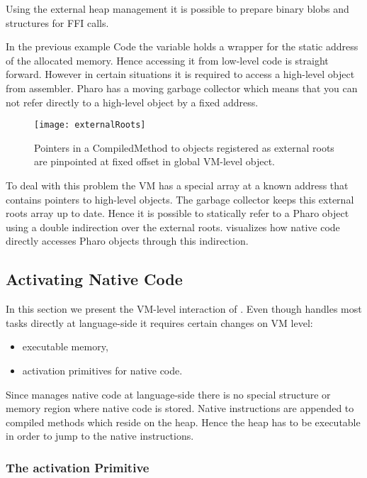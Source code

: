 Using the external heap management it is possible to prepare binary blobs and structures for FFI calls.

In the previous example Code  the  variable holds a wrapper for the static address of the allocated memory.
Hence accessing it from low-level code is straight forward.
However in certain situations it is required to access a high-level object from assembler.
Pharo has a moving garbage collector which means that you can not refer directly to a high-level object by a fixed address.

\begin{figure}[h]
	\centering
	\texttt{[image: externalRoots]}
	\caption{Pointers in a CompiledMethod to objects registered as external roots are pinpointed at fixed offset in global VM-level object. 
	}
\end{figure}

To deal with this problem the VM has a special array at a known address that contains pointers to high-level objects.
The garbage collector keeps this external roots array up to date.
Hence it is possible to statically refer to a Pharo object using a double indirection over the external roots.
 visualizes how native code directly accesses Pharo objects through this indirection.


\subsection{Activating Native Code}

In this section we present the VM-level interaction of \NB.
Even though \NB handles most tasks directly at language-side it requires certain changes on VM level:
\begin{itemize}
	\item executable memory,
	\item activation primitives for native code.
\end{itemize}
%
Since \NB manages native code at language-side there is no special structure or memory region where native code is stored.
Native instructions are appended to compiled methods which reside on the heap.
Hence the heap has to be executable in order to jump to the native instructions.


\subsubsection{The \NB activation Primitive}

